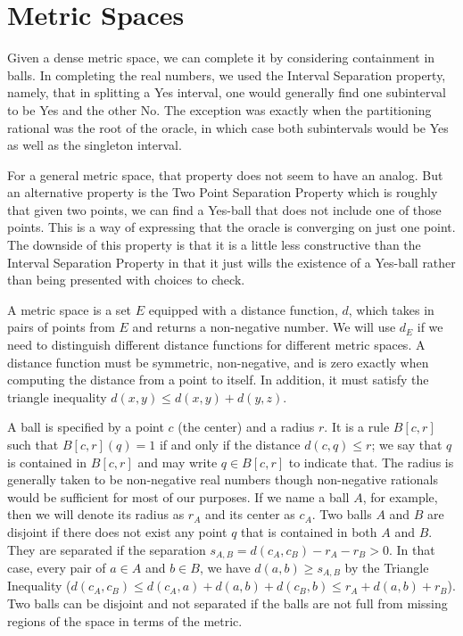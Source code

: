 \documentclass[12pt]{article}
\begin{document}
 
\section{Metric Spaces}


Given a dense metric space, we can complete it by considering containment in balls. In completing the real numbers, we used the Interval Separation property, namely, that in splitting a Yes interval, one would generally find one subinterval to be Yes and the other No. The exception was exactly when the partitioning rational was the root of the oracle, in which case both subintervals would be Yes as well as the singleton interval. 

For a general metric space, that property does not seem to have an analog. But an alternative property is the Two Point Separation Property which is roughly that given two points, we can find a Yes-ball that does not include one of those points. This is a way of expressing that the oracle is converging on just one point. The downside of this property is that it is a little less constructive than the Interval Separation Property in that it just wills the existence of a Yes-ball rather than being presented with choices to check.

A metric space is a set $E$ equipped with a distance function, $d$, which takes in pairs of points from $E$ and returns a non-negative number. We will use $d_E$ if we need to distinguish different distance functions for different metric spaces. A distance function must be symmetric, non-negative, and is zero exactly when computing the distance from a point to itself. In addition, it must satisfy the triangle inequality $d(x,y) \leq d(x,y) + d(y,z)$. 

A ball is specified by a point $c$ (the center) and a radius $r$. It is a rule $B[c,r]$ such that $B[c,r](q) = 1$ if and only if the distance $d(c,q) \leq  r$; we say that $q$ is contained in $B[c,r]$ and may write $q \in B[c,r]$ to indicate that. The radius is generally taken to be non-negative real numbers though non-negative rationals would be sufficient for most of our purposes. If we name a ball $A$, for example, then we will denote its radius as $r_A$ and its center as $c_A$. Two balls $A$ and $B$ are disjoint if there does not exist any point $q$ that is contained in both $A$ and $B$. They are separated if the separation $s_{A,B} = d(c_A, c_B) - r_A - r_B > 0$. In that case, every pair of $a \in A$ and $b \in B$, we have $d(a,b) \geq s_{A,B}$ by the Triangle Inequality ($d(c_A, c_B) \leq d(c_A, a) + d(a,b) + d(c_B, b) \leq r_A + d(a,b) + r_B$).  Two  balls can be disjoint and not separated if the balls are not full from missing regions of the space in terms of the metric. 
\end{document}
